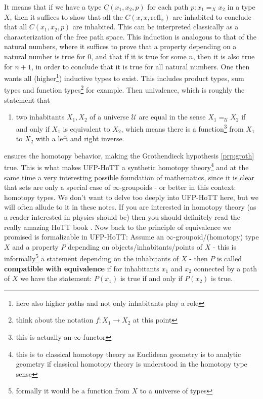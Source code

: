 It means that if we have a type $C(x_{1},x_{2},p)$ for each path $p \colon x_{1} =_{X} x_{2}$ in a type $X$, then it suffices to show that all the $C(x,x,\mathrm{refl}_{x})$ are inhabited to conclude that all $C(x_{1},x_{2},p)$ are inhabited.
This can be interpreted classically as a characterization of the free path space.
This induction is analogous to that of the natural numbers, where it suffices to prove that a property depending on a natural number is true for $0$, and that if it is true for some $n$, then it is also true for $n+1$, in order to conclude that it is true for all natural numbers.
One then wants all (higher\footnote{here also higher paths and not only inhabitants play a role}) inductive types to exist.
This includes product types, sum types and function types\footnote{think about the notation $f \colon X_{1} \rightarrow X_{2}$ at this point} for example.
Then univalence, which is roughly the statement that
\begin{enumerate}
\item[$\bullet$]
two inhabitants $X_{1},X_{2}$ of a universe $\mathcal{U}$ are equal in the sense $X_{1} =_{\mathcal{U}} X_{2}$ if and only if $X_{1}$ is equivalent to $X_{2}$, which means there is a function\footnote{this is actually an $\infty$-functor} from $X_{1}$ to $X_{2}$ with a left and right inverse.
\end{enumerate}
ensures the homotopy behavior, making the Grothendieck hypothesis \ref{prp:groth} true.
This is what makes UFP-HoTT a synthetic homotopy theory\footnote{this is to classical homotopy theory as Euclidean geometry is to analytic geometry if classical homotopy theory is understood in the homotopy type sense} and at the same time a very interesting possible foundation of mathematics, since it is clear that sets are only a special case of $\infty$-groupoids - or better in this context: homotopy types.
We don't want to delve too deeply into UFP-HoTT here, but we will often allude to it in these notes.
If you are interested in homotopy theory (as a reader interested in physics should be) then you should definitely read the really amazing HoTT book \cite{1ba1603e}.
Now back to the principle of equivalence we promised is formalizable in UFP-HoTT: Assume an $\infty$-groupoid/(homotopy) type $X$ and a property $P$ depending on objects/inhabitants/points of $X$ - this is informally\footnote{formally it would be a function from $X$ to a universe of types} a statement depending on the inhabitants of $X$ - then $P$ is called \textbf{compatible with equivalence} if for inhabitants $x_{1}$ and $x_{2}$ connected by a path of $X$ we have the statement: $P(x_{1})$ is true if and only if $P(x_{2})$ is true.
